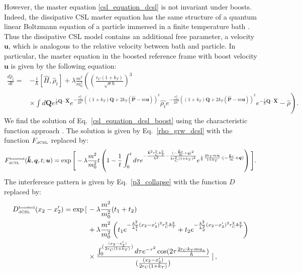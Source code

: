 \documentclass[12pt,groupedaddress,pra,aps]{revtex4-1}
\begin{document}
However, the master equation \eqref{csl_equation_dcsl} is not invariant under boosts. Indeed, the dissipative CSL master equation has the same structure of a  quantum linear Boltzmann equation of a particle immersed in a finite temperature bath \cite{Vacchini200971}. Thus the dissipative CSL model contains an additional free parameter, a velocity $\bm{u}$, which is analogous to the relative velocity between bath and particle. In particular, the master equation in the boosted reference frame with boost velocity $\bm{u}$ is given by the following equation:
\begin{equation}\label{csl_equation_dcsl_boost}
\begin{split}
\frac{d \hat{\rho}_t}{dt} = &-\frac{i}{\hbar}\left[ \hat{H}, \hat{\rho}_t\right]
+\lambda \frac{m^2}{m_0^2}\left(\right. \left(\frac{r_C(1+k_T) }{\sqrt{\pi} \hbar} \right)^3 \\
&\times \int d\bm{Q} e^{\frac{i}{\hbar} \bm{Q} \cdot \bm{\hat{X}} }  e^{-\frac{r_C^2}{2\hbar^2}((1+k_T) \bm{Q}+2k_T(\bm{\hat{P}} - m  \bm{u}))^2 } \hat{\rho_t} e^{-\frac{r_C^2}{2\hbar^2}((1+k_T)\bm{Q}+2k_T(\bm{\hat{P}} - m \bm{u}))^2 } e^{-\frac{i}{\hbar} \bm{Q} \cdot \bm{\hat{X}} } - \hat{\rho} \left.\right).
\end{split}
\end{equation}
We find the solution of Eq.~\eqref{csl_equation_dcsl_boost} using the characteristic function approach \cite{PhysRevA.82.042111}. The solution is given by Eq.~\eqref{rho_grw_dcsl} with the function $F_{\text{\tiny dCSL}}$ replaced by:
\begin{equation}\label{FF_dcsl_boost}
F_{\text{\tiny dCSL}}^{\text{\tiny boosted}}(\bm{\tilde{k}},\bm{q},t; \bm{u})= \exp\Bigg[-\lambda \frac{m^2}{m_0^2} t  \left(1-\frac{1}{t}\int_0^t d\tau e^{-\frac{\bm{\tilde{k}}^2r_C^2 k_T^2 }{\hbar^2} 
-\frac{(-\frac{\bm{\tilde{k}}\tau}{m}+\bm{q})^2}{4r_C^2 (1+k_T)^2}}
e^{\frac{i}{\hbar}\frac{2k_T m \bm{u}}{1+k_T}\cdot(-\frac{\bm{\tilde{k}}\tau}{m}+\bm{q}) }  \right) \Bigg].
\end{equation}
The interference pattern is given by Eq.~\eqref{p3_collapse} with the function $D$ replaced by:
\begin{equation}\label{cfunc_dcsl_boost}
\begin{split}
D_{\text{\tiny dCSL}}^{\text{\tiny boosted}}(x_2-x_2')= \exp \left[\right.&-\lambda \frac{m^2}{m_0^2} (t_1+t_2) \\
&+ \lambda \frac{m^2}{m_0^2} \left( t_1 e^{-\frac{k^2}{L_1^2}(x_2-x'_2)^2 r_C^2 k_T^2}+t_2 e^{-\frac{k^2}{L_2^2}(x_2-x'_2)^2 r_C^2 k_T^2 }\right) \\
&\times\frac{\int_0^{ (\frac{(x_2-x_2')}{2r_C(1+k_T)})}d\tau e^{-\tau^2}\cos(2\tau\frac{2 r_Ck_T m u_x}{\hbar} )}{ (\frac{ (x_2-x_2')}{2 r_C(1+k_T)})} \left. \right],
\end{split}
\end{equation}
\end{document}
